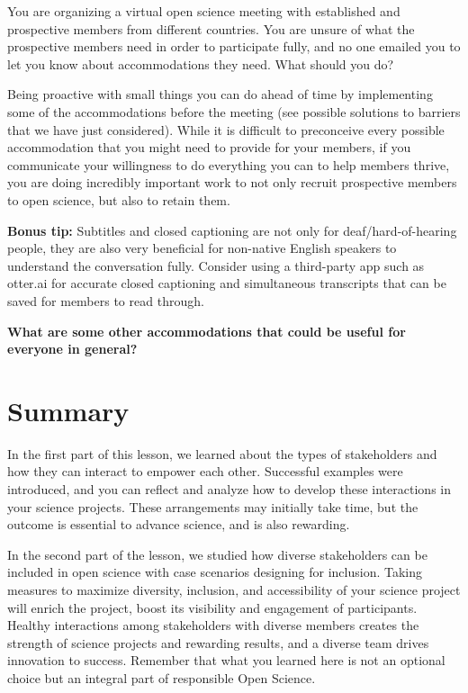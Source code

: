 \documentclass[
  letterpaper,
  DIV=11,
  numbers=noendperiod]{scrreport}
\begin{document}
You are organizing a virtual open science meeting with established and
prospective members from different countries. You are unsure of what the
prospective members need in order to participate fully, and no one
emailed you to let you know about accommodations they need. What should
you do?

Being proactive with small things you can do ahead of time by
implementing some of the accommodations before the meeting (see possible
solutions to barriers that we have just considered). While it is
difficult to preconceive every possible accommodation that you might
need to provide for your members, if you communicate your willingness to
do everything you can to help members thrive, you are doing incredibly
important work to not only recruit prospective members to open science,
but also to retain them.

\textbf{Bonus tip:} Subtitles and closed captioning are not only for
deaf/hard-of-hearing people, they are also very beneficial for
non-native English speakers to understand the conversation fully.
Consider using a third-party app such as otter.ai for accurate closed
captioning and simultaneous transcripts that can be saved for members to
read through.

\textbf{What are some other accommodations that could be useful for
everyone in general?}

\hypertarget{summary-2}{%
\section{Summary}\label{summary-2}}

In the first part of this lesson, we learned about the types of
stakeholders and how they can interact to empower each other. Successful
examples were introduced, and you can reflect and analyze how to develop
these interactions in your science projects. These arrangements may
initially take time, but the outcome is essential to advance science,
and is also rewarding.

In the second part of the lesson, we studied how diverse stakeholders
can be included in open science with case scenarios designing for
inclusion. Taking measures to maximize diversity, inclusion, and
accessibility of your science project will enrich the project, boost its
visibility and engagement of participants. Healthy interactions among
stakeholders with diverse members creates the strength of science
projects and rewarding results, and a diverse team drives innovation to
success. Remember that what you learned here is not an optional choice
but an integral part of responsible Open Science.
\end{document}
